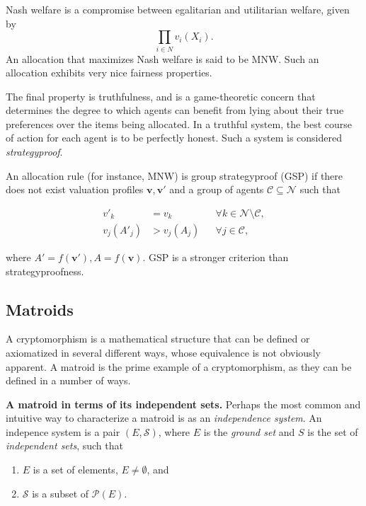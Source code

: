Nash welfare is a compromise between egalitarian and utilitarian welfare, given by \[\prod_{i \in N} v_i(X_i).\] An allocation that maximizes Nash welfare is said to be MNW. Such an allocation exhibits very nice fairness properties.

The final property is truthfulness, and is a game-theoretic concern that determines the degree to which agents can benefit from lying about their true preferences over the items being allocated. In a truthful system, the best course of action for each agent is to be perfectly honest. Such a system is considered \textit{strategyproof}.

An allocation rule (for instance, MNW) is group strategyproof (GSP) if there does not exist valuation profiles $\mathbf{v}, \mathbf{v}'$ and a  group of agents $\mathcal{C} \subseteq \mathcal{N}$ such that

\[\begin{aligned}
    v'_k      & = v_k      &  & \forall k \in \mathcal{N} \setminus \mathcal{C}, \\
    v_j(A'_j) & > v_j(A_j) &  & \forall j \in \mathcal{C},
  \end{aligned}\]

where $A' = f(\mathbf{v}'), A = f(\mathbf{v})$. GSP is a stronger criterion than strategyproofness.


\skelpars[12]


\subsection*{Matroids}
A cryptomorphism is a mathematical structure that can be defined or axiomatized in several different ways, whose equivalence is not obviously apparent. A matroid is the prime example of a cryptomorphism, as they can be defined in a number of ways.



\textbf{A matroid in terms of its independent sets.} Perhaps the most common and intuitive way to characterize a matroid is as an \textit{independence system}. An indepence system is a pair $(E,\mathcal{S})$, where $E$ is the \textit{ground set} and $S$ is the set of \textit{independent sets}, such that

\begin{enumerate}[align=left]
  \item $E$ is a set of elements, $E \not = \emptyset$, and
  \item $\mathcal{S}$ is a subset of $\mathcal{P}(E)$.
\end{enumerate}

